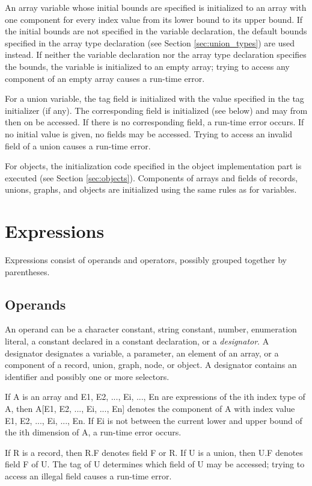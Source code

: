 \documentclass[10pt]{article}
\begin{document}
An array variable whose initial bounds are specified is initialized to an
array with one component for every index value from
its lower bound to its upper bound.
If the initial bounds are not specified in the variable declaration,
the default bounds specified in the array type declaration (see
Section \ref{sec:union_types}) are used instead.
If neither the variable declaration nor the array type declaration
specifies the bounds, the variable is initialized to an empty array;
trying to access any component of an empty array causes a run-time error.

For a union variable, the tag field is initialized with the value
specified in the tag initializer (if any).
The corresponding field
is initialized (see below) and may from then on be accessed.
If there is no corresponding field, a run-time error occurs.
If no initial value is given, no fields may be accessed.
Trying to access an invalid field of a union causes
a run-time error.

For objects, the initialization code specified in the object
implementation part is executed (see Section \ref{sec:objects}).
Components of arrays and fields of records, unions, graphs, and objects
are initialized using the same rules as for variables.
\section{Expressions}\label{sec:expressions}

Expressions consist of operands and operators, possibly grouped together
by parentheses.
\subsection{Operands}\label{sec:operands}

An operand can be
a character constant, string constant,
number, enumeration literal,
a constant declared in a constant declaration,
or a {\em designator}.
A designator designates a variable, a parameter, an element of an array,
or a component of a record, union, graph, node, or object.
A designator contains an identifier and possibly one or more selectors.

If A is an array and E1, E2, ..., Ei, ..., En are expressions of the ith
index type of A, then A[E1, E2, ..., Ei, ..., En]
denotes the component of A with index value E1, E2, ..., Ei, ..., En.
If Ei is not between the current lower and upper bound of the ith dimension of A,
a run-time error occurs.

If R is a record, then R.F denotes field F or R.
If U is a union, then U.F denotes field F of U.
The tag of U determines which field
of U may be accessed; trying to access an illegal field causes
a run-time error.
\end{document}
